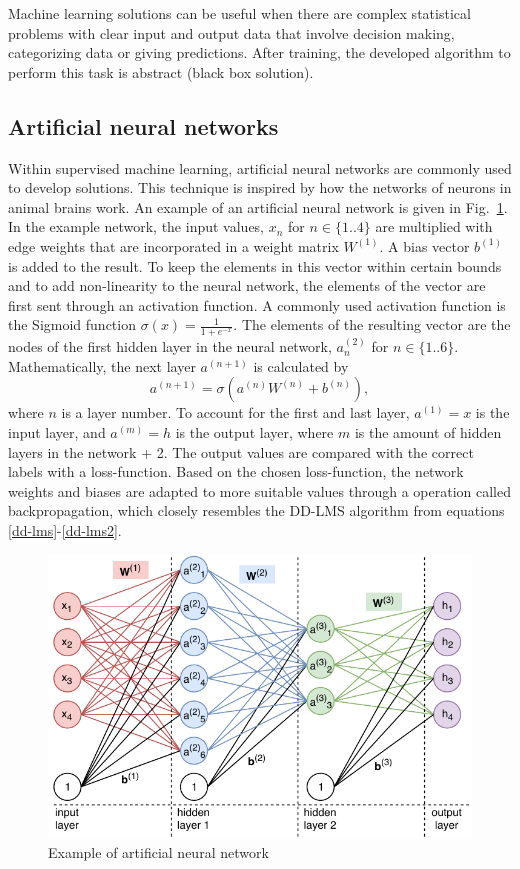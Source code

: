 \documentclass[journal,10pt,twoside, a4paper]{IEEEtran}
\begin{document}
Machine learning solutions can be useful when there are complex statistical problems with clear  input and output data that involve decision making, categorizing data or giving predictions. After training, the developed algorithm to perform this task is abstract (black box solution).

\subsection{Artificial neural networks}
Within supervised machine learning, artificial neural networks are commonly used to develop solutions. This technique is inspired by how the networks of neurons in animal brains work. An example of an artificial neural network is given in Fig.~\ref{fig:nn}. In the example network, the input values, $x_n$ for $n\in \{1..4\}$ are multiplied with edge weights that are incorporated in a weight matrix $W^{(1)}$. A bias vector $b^{(1)}$ is added to the result. To keep the elements in this vector within certain bounds and to add non-linearity to the neural network, the elements of the vector are first sent through an activation function. A commonly used activation function is the Sigmoid function $\sigma(x) = \frac{1}{1+e^{-x}}$. The elements of the resulting vector are the nodes of the first hidden layer in the neural network, $a_n^{(2)}$ for $n\in \{1..6\}$. Mathematically, the next layer $a^{(n+1)}$ is calculated by 
\begin{equation}
    a^{(n+1)} = \sigma\left(a^{(n)}W^{(n)}+b^{(n)}\right),
\end{equation}
where $n$ is a layer number. To account for the first and last layer, $a^{(1)} = x$ is the input layer, and $a^{(m)} = h$ is the output layer, where $m$ is the amount of hidden layers in the network + 2. The output values are compared with the correct labels with a loss-function. Based on the chosen loss-function, the network weights and biases are adapted to more suitable values through a operation called backpropagation\cite{backpropagation}, which closely resembles the DD-LMS algorithm from equations \ref{dd-lms}-\ref{dd-lms2}.

\begin{figure}
    \centering
    \includegraphics[width=\linewidth]{Thesis/images/nn.pdf}
    \caption{Example of artificial neural network}
    \label{fig:nn}
\end{figure}
\end{document}
